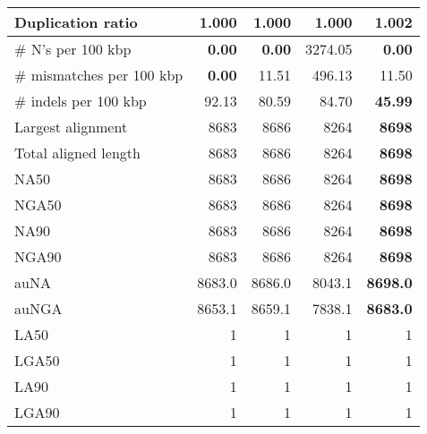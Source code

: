 \documentclass[12pt,a4paper]{article}
\begin{document}
\begin{table}[ht]
\begin{center}
\begin{tabular}{|l*{4}{|r}|}
Duplication ratio & {\bf 1.000} & {\bf 1.000} & {\bf 1.000} & 1.002 \\ \hline
\# N's per 100 kbp & {\bf 0.00} & {\bf 0.00} & 3274.05 & {\bf 0.00} \\ \hline
\# mismatches per 100 kbp & {\bf 0.00} & 11.51 & 496.13 & 11.50 \\ \hline
\# indels per 100 kbp & 92.13 & 80.59 & 84.70 & {\bf 45.99} \\ \hline
Largest alignment & 8683 & 8686 & 8264 & {\bf 8698} \\ \hline
Total aligned length & 8683 & 8686 & 8264 & {\bf 8698} \\ \hline
NA50 & 8683 & 8686 & 8264 & {\bf 8698} \\ \hline
NGA50 & 8683 & 8686 & 8264 & {\bf 8698} \\ \hline
NA90 & 8683 & 8686 & 8264 & {\bf 8698} \\ \hline
NGA90 & 8683 & 8686 & 8264 & {\bf 8698} \\ \hline
auNA & 8683.0 & 8686.0 & 8043.1 & {\bf 8698.0} \\ \hline
auNGA & 8653.1 & 8659.1 & 7838.1 & {\bf 8683.0} \\ \hline
LA50 & 1 & 1 & 1 & 1 \\ \hline
LGA50 & 1 & 1 & 1 & 1 \\ \hline
LA90 & 1 & 1 & 1 & 1 \\ \hline
LGA90 & 1 & 1 & 1 & 1 \\ \hline
\end{tabular}
\end{center}
\end{table}
\end{document}
